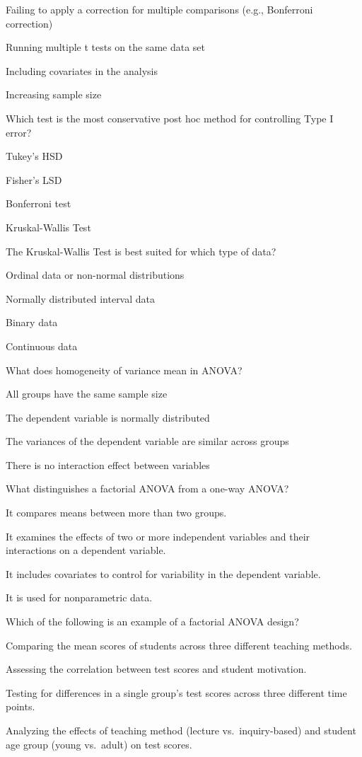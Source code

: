 \documentclass[
  letterpaper,
  DIV=11,
  numbers=noendperiod]{scrreprt}
\begin{document}
Failing to apply a correction for multiple comparisons (e.g., Bonferroni
correction)

Running multiple t tests on the same data set

Including covariates in the analysis

Increasing sample size

Which test is the most conservative post hoc method for controlling Type
I error?

Tukey's HSD

Fisher's LSD

Bonferroni test

Kruskal-Wallis Test

The Kruskal-Wallis Test is best suited for which type of data?

Ordinal data or non-normal distributions

Normally distributed interval data

Binary data

Continuous data

What does homogeneity of variance mean in ANOVA?

All groups have the same sample size

The dependent variable is normally distributed

The variances of the dependent variable are similar across groups

There is no interaction effect between variables

What distinguishes a factorial ANOVA from a one-way ANOVA?

It compares means between more than two groups.

It examines the effects of two or more independent variables and their
interactions on a dependent variable.

It includes covariates to control for variability in the dependent
variable.

It is used for nonparametric data.

Which of the following is an example of a factorial ANOVA design?

Comparing the mean scores of students across three different teaching
methods.

Assessing the correlation between test scores and student motivation.

Testing for differences in a single group's test scores across three
different time points.

Analyzing the effects of teaching method (lecture vs.~inquiry-based) and
student age group (young vs.~adult) on test scores.
\end{document}
